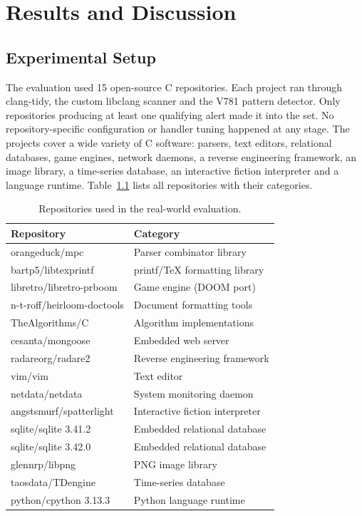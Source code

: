 \chapter{Results and Discussion}
\label{chap:results}

\section{Experimental Setup}
\label{sec:setup}

The evaluation used 15 open-source C repositories. Each project ran through clang-tidy, the custom libclang scanner and the V781 pattern detector. Only repositories producing at least one qualifying alert made it into the set. No repository-specific configuration or handler tuning happened at any stage. The projects cover a wide variety of C software: parsers, text editors, relational databases, game engines, network daemons, a reverse engineering framework, an image library, a time-series database, an interactive fiction interpreter and a language runtime. Table~\ref{tab:repos} lists all repositories with their categories.

{%
\renewcommand{\arraystretch}{1.3}
\setlength{\tabcolsep}{5pt}
\begin{table}[ht]
\caption{Repositories used in the real-world evaluation.}
\label{tab:repos}
\centering
\begin{tabular}{|l|l|}
\hline
\textbf{Repository} & \textbf{Category} \\
\hline
orangeduck/mpc          & Parser combinator library \\
bartp5/libtexprintf     & printf/\TeX{} formatting library \\
libretro/libretro-prboom & Game engine (DOOM port) \\
n-t-roff/heirloom-doctools & Document formatting tools \\
TheAlgorithms/C         & Algorithm implementations \\
cesanta/mongoose        & Embedded web server \\
radareorg/radare2       & Reverse engineering framework \\
vim/vim                 & Text editor \\
netdata/netdata         & System monitoring daemon \\
angstsmurf/spatterlight & Interactive fiction interpreter \\
sqlite/sqlite 3.41.2    & Embedded relational database \\
sqlite/sqlite 3.42.0    & Embedded relational database \\
glennrp/libpng          & PNG image library \\
taosdata/TDengine       & Time-series database \\
python/cpython 3.13.3   & Python language runtime \\
\hline
\end{tabular}
\end{table}
}

